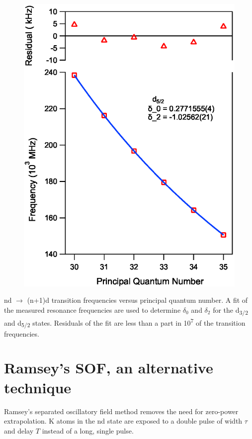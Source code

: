 \documentclass[landscape]{sciposter}
\begin{document}
\begin{multicols}{4}
\begin{figure}
\begin{center}
\includegraphics[scale = 0.97]{d52_qd.eps}
\end{center}
\end{figure}

nd $\rightarrow$ (n+1)d transition frequencies versus principal quantum number. A fit of the measured resonance frequencies are used to determine $\delta_0$ and $\delta_2$ for the d\textsubscript{3/2} and d\textsubscript{5/2} states. Residuals of the fit are less than a part in 10\textsuperscript{7} of the transition frequencies.

\section*{\large Ramsey's SOF, an alternative technique}
Ramsey's separated oscillatory field method removes the need for zero-power extrapolation. K atoms in the nd state are exposed to a double pulse of width $\tau$ and delay $T$ instead of a long, single pulse. 


\end{multicols}
\end{document}
